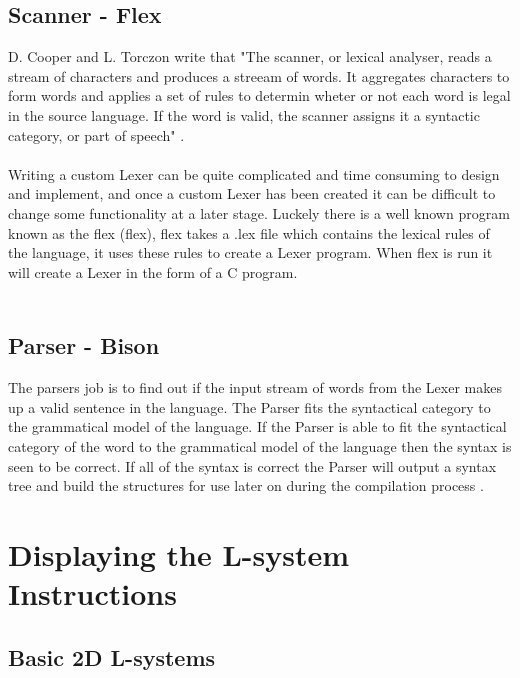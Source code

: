 \subsection{Scanner - Flex} \label{Flex}

D. Cooper and L. Torczon write that "The scanner, or lexical analyser, reads a stream of characters and produces a streeam of words. It aggregates characters to form words and applies a set of rules to determin wheter or not each word is legal in the source language. If the word is valid, the scanner assigns it a syntactic category, or part of speech" \cite{cooper2011engineering}. \\
\\ 
Writing a custom \gls{Lexer} can be quite complicated and time consuming to design and implement, and once a custom \gls{Lexer} has been created it can be difficult to change some functionality at a later stage. Luckely there is a well known program known as the \acrlong{flex} (\acrshort{flex}), \acrshort{flex} takes a .lex file which contains the lexical rules of the language, it uses these rules to create a \gls{Lexer} program. When \acrshort{flex} is run it will create a \gls{Lexer} in the form of a C program. \\
\\    


\subsection{Parser - Bison} \label{Bison}

The parsers job is to find out if the input stream of words from the \gls{Lexer} makes up a valid sentence in the language. The \gls{Parser} fits the syntactical category to the grammatical model of the language. If the \gls{Parser} is able to fit the syntactical category of the word to the grammatical model of the language then the syntax is seen to be correct. If all of the syntax is correct the \gls{Parser} will output a syntax tree and build the structures for use later on during the compilation process \cite{cooper2011engineering}.




\section{Displaying the L-system Instructions} \label{Display L-system Instructions}

\subsection{Basic 2D L-systems} 

